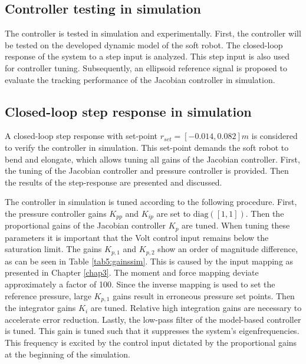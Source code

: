 \subsection{Controller testing in simulation}

The controller is tested in simulation and experimentally. First, the controller will be tested on the developed dynamic model of the soft robot. The closed-loop response of the system to a step input is analyzed. This step input is also used for controller tuning. Subsequently, an ellipsoid reference signal is proposed to evaluate the tracking performance of the Jacobian controller in simulation. 


\subsection*{Closed-loop step response in simulation}

A closed-loop step response with set-point $r_{set} = [-0.014,0.082]m$ is considered to verify the controller in simulation. This set-point demands the soft robot to bend and elongate, which allows tuning all gains of the Jacobian controller. First, the tuning of the Jacobian controller and pressure controller is provided. Then the results of the step-response are presented and discussed. 

The controller in simulation is tuned according to the following procedure. First, the pressure controller gains $K_{pp}$ and $K_{ip}$ are set to $\text{diag}([1,1])$. Then the proportional gains of the Jacobian controller $K_p$ are tuned. When tuning these parameters it is important that the Volt control input remains below the saturation limit. The gains $K_{p,1}$ and $K_{p,2}$ show an order of magnitude difference, as can be seen in Table \ref{tab5:gainssim}. This is caused by the input mapping as presented in Chapter \ref{chap3}. The moment and force mapping deviate approximately a factor of 100. Since the inverse mapping is used to set the reference pressure, large $K_{p,1}$ gains result in erroneous pressure set points. Then the integrator gains $K_i$ are tuned. Relative high integration gains are necessary to accelerate error reduction. Lastly, the low-pass filter of the model-based controller is tuned. This gain is tuned such that it suppresses the system's eigenfrequencies. This frequency is excited by the control input dictated by the proportional gains at the beginning of the simulation. 



